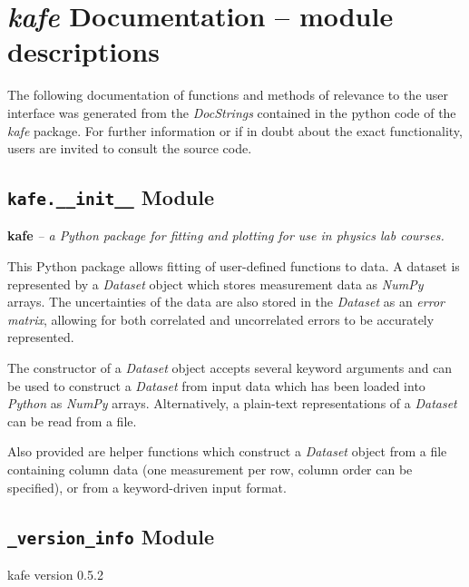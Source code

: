 \documentclass[a4paper,10pt,english]{sphinxmanual}
\begin{document}
\chapter{\emph{kafe} Documentation -- module descriptions}
\label{index:kafe-documentation-module-descriptions}
The following documentation of functions and methods
of relevance to the user interface was generated from
the \emph{DocStrings} contained in the python code of the
\emph{kafe} package.
For further information or if in doubt about the exact
functionality, users are invited to consult the source
code.


\section{\texttt{kafe.\_\_init\_\_} Module}
\label{index:module-kafe.__init__}\label{index:kafe-init-module}
\textbf{kafe} \emph{-- a Python package for fitting and plotting for use in physics lab courses.}

This Python package allows fitting of user-defined functions to data. A dataset
is represented by a \emph{Dataset} object which stores measurement data as \emph{NumPy}
arrays. The uncertainties of the data are also stored in the \emph{Dataset} as an
\emph{error matrix}, allowing for both correlated and uncorrelated errors to be
accurately represented.

The constructor of a \emph{Dataset} object accepts several keyword arguments and can
be used to construct a \emph{Dataset} from input data which has been loaded into
\emph{Python} as \emph{NumPy} arrays. Alternatively, a plain-text representations of a
\emph{Dataset} can be read from a file.

Also provided are helper functions which construct a \emph{Dataset} object from a
file containing column data (one measurement per row, column order can be
specified), or from a keyword-driven input format.


\section{\texttt{\_version\_info} Module}
\label{index:module-kafe._version_info}\label{index:version-info-module}\label{index:module-__version_info}

\begin{fulllineitems}
\label{index:kafe._version_info.get_version}
kafe version 0.5.2

\end{fulllineitems}
\end{document}
